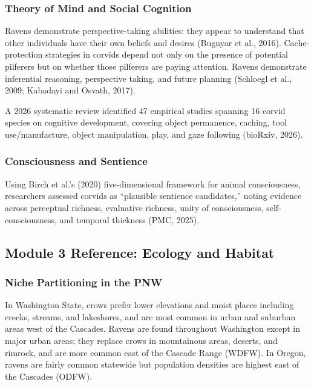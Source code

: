 \documentclass[11pt,letterpaper]{article}
\begin{document}
\subsubsection{Theory of Mind and Social Cognition}

Ravens demonstrate perspective-taking abilities: they appear to understand that other individuals have their own beliefs and desires (Bugnyar et al., 2016). Cache-protection strategies in corvids depend not only on the presence of potential pilferers but on whether those pilferers are paying attention. Ravens demonstrate inferential reasoning, perspective taking, and future planning (Schloegl et al., 2009; Kabadayi and Osvath, 2017).

A 2026 systematic review identified 47 empirical studies spanning 16 corvid species on cognitive development, covering object permanence, caching, tool use/manufacture, object manipulation, play, and gaze following (bioRxiv, 2026).

\subsubsection{Consciousness and Sentience}

Using Birch et al.'s (2020) five-dimensional framework for animal consciousness, researchers assessed corvids as ``plausible sentience candidates,'' noting evidence across perceptual richness, evaluative richness, unity of consciousness, self-consciousness, and temporal thickness (PMC, 2025).

\subsection{Module 3 Reference: Ecology and Habitat}

\subsubsection{Niche Partitioning in the PNW}

In Washington State, crows prefer lower elevations and moist places including creeks, streams, and lakeshores, and are most common in urban and suburban areas west of the Cascades. Ravens are found throughout Washington except in major urban areas; they replace crows in mountainous areas, deserts, and rimrock, and are more common east of the Cascade Range (WDFW). In Oregon, ravens are fairly common statewide but population densities are highest east of the Cascades (ODFW).
\end{document}
